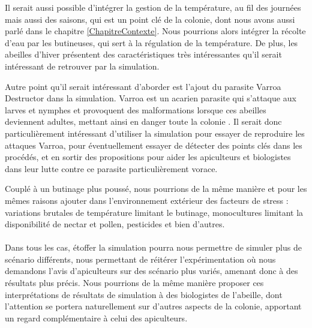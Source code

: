 	Il serait aussi possible d'intégrer la gestion de la température, au fil des journées mais aussi des saisons, qui est un point clé de la colonie, dont nous avons aussi parlé dans le chapitre \ref{ChapitreContexte}. Nous pourrions alors intégrer la récolte d'eau par les butineuses, qui sert à la régulation de la température. De plus, les abeilles d'hiver présentent des caractéristiques très intéressantes qu'il serait intéressant de retrouver par la simulation. 
	
	Autre point qu'il serait intéressant d'aborder est l'ajout du parasite Varroa Destructor dans la simulation. Varroa est un acarien parasite qui s'attaque aux larves et nymphes et provoquent des malformations lorsque ces abeilles deviennent adultes, mettant ainsi en danger toute la colonie \cite{le_conte_varroa_2010}. Il serait donc particulièrement intéressant d'utiliser la simulation pour essayer de reproduire les attaques Varroa, pour éventuellement essayer de détecter des points clés dans les procédés, et en sortir des propositions pour aider les apiculteurs et biologistes dans leur lutte contre ce parasite particulièrement vorace.
	
	Couplé à un butinage plus poussé, nous pourrions de la même manière et pour les mêmes raisons ajouter dans l'environnement extérieur des facteurs de stress : variations brutales de température limitant le butinage, monocultures limitant la disponibilité de nectar et pollen, pesticides et bien d'autres.
	
	\paragraph{}
	Dans tous les cas, étoffer la simulation pourra nous permettre de simuler plus de scénario différents, nous permettant de réitérer l'expérimentation où nous demandons l'avis d'apiculteurs sur des scénario plus variés, amenant donc à des résultats plus précis. Nous pourrions de la même manière proposer ces interprétations de résultats de simulation à des biologistes de l'abeille, dont l'attention se portera naturellement sur d'autres aspects de la colonie, apportant un regard complémentaire à celui des apiculteurs.
	
	
			
